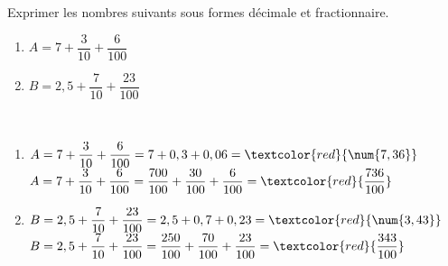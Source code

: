 \begin{exercice} %
   Exprimer les nombres suivants sous formes décimale et fractionnaire. \smallskip
   \begin{multicols}{2}
      \begin{enumerate}
         \item $A=7+\dfrac{3}{10}+\dfrac{6}{100}$
         \item $B=2,5+\dfrac{7}{10}+\dfrac{23}{100}$
      \end{enumerate}
   \end{multicols}

\end{exercice}

\begin{corrige}
   \ \\ [-5mm]
   \begin{enumerate}
      \item $A=7+\dfrac{3}{10}+\dfrac{6}{100} = 7+0,3+0,06 =\textcolor{red}{\num{7,36}}$ \\ [2mm]
         $A=7+\dfrac{3}{10}+\dfrac{6}{100} =\dfrac{700}{100}+\dfrac{30}{100}+\dfrac{6}{100} =\textcolor{red}{\dfrac{736}{100}}$ \medskip
      \item $B=2,5+\dfrac{7}{10}+\dfrac{23}{100} = 2,5+0,7+0,23 =\textcolor{red}{\num{3,43}}$ \\ [2mm]
         $B=2,5+\dfrac{7}{10}+\dfrac{23}{100} =\dfrac{250}{100}+\dfrac{70}{100}+\dfrac{23}{100} =\textcolor{red}{\dfrac{343}{100}}$
   \end{enumerate}
\end{corrige}